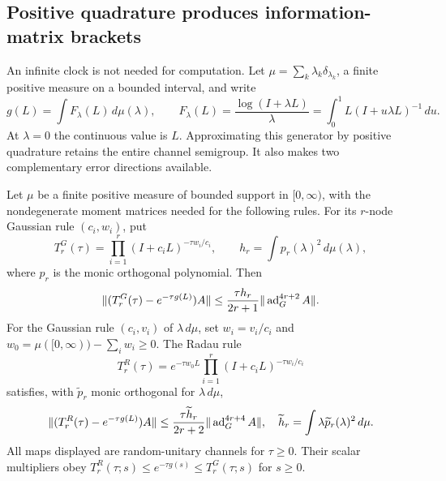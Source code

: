 \subsection{Positive quadrature produces information-matrix brackets}
\label{op:quadrature}

An infinite clock is not needed for computation. Let
$\mu=\sum_k\lambda_k\delta_{\lambda_k}$, a finite positive measure on a
bounded interval, and write
\[
 g(L)=\int F_\lambda(L)\,d\mu(\lambda),\qquad
 F_\lambda(L)=\frac{\log(I+\lambda L)}\lambda
 =\int_0^1 L(I+u\lambda L)^{-1}\,du.
\]
At $\lambda=0$ the continuous value is $L$. Approximating this generator
by positive quadrature retains the entire channel semigroup. It also makes
two complementary error directions available.

\begin{theorem}
\label{op:quadrature-theorem}
Let $\mu$ be a finite positive measure of bounded support in $[0,\infty)$,
with the nondegenerate moment matrices needed for the following rules.
For its $r$-node Gaussian rule $(c_i,w_i)$, put
\[
 T_r^G(\tau)=\prod_{i=1}^r(I+c_iL)^{-\tau w_i/c_i},\qquad
 h_r=\int p_r(\lambda)^2\,d\mu(\lambda),
\]
where $p_r$ is the monic orthogonal polynomial. Then
\begin{equation}
 \|(T_r^G(\tau)-e^{-\tau g(L)})A\|
 \le\frac{\tau h_r}{2r+1}\|\operatorname{ad}_G^{4r+2}A\|.
 \label{op:gauss-error}
\end{equation}
For the Gaussian rule $(c_i,v_i)$ of $\lambda\,d\mu$, set
$w_i=v_i/c_i$ and $w_0=\mu([0,\infty))-\sum_iw_i\ge0$. The Radau rule
\[
 T_r^R(\tau)=e^{-\tau w_0L}
 \prod_{i=1}^r(I+c_iL)^{-\tau w_i/c_i}
\]
satisfies, with $\widetilde p_r$ monic orthogonal for $\lambda\,d\mu$,
\begin{equation}
 \|(T_r^R(\tau)-e^{-\tau g(L)})A\|
 \le\frac{\tau\widetilde h_r}{2r+2}\|\operatorname{ad}_G^{4r+4}A\|,
 \quad
 \widetilde h_r=\int\lambda\widetilde p_r(\lambda)^2\,d\mu.
 \label{op:radau-error}
\end{equation}
All maps displayed are random-unitary channels for $\tau\ge0$. Their
scalar multipliers obey $T_r^R(\tau;s)\le e^{-\tau g(s)}\le T_r^G(\tau;s)$
for $s\ge0$.
\end{theorem}

